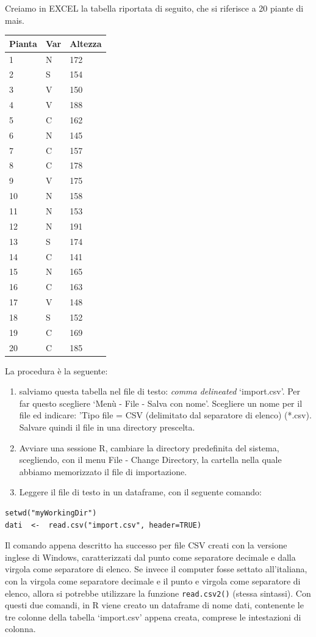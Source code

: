 \documentclass[a4paper,12pt,oneside]{book}
\providecommand{\tightlist}{%
  \setlength{\itemsep}{0pt}\setlength{\parskip}{0pt}}
\begin{document}
Creiamo in EXCEL la tabella riportata di seguito, che si riferisce a 20 piante di mais.

\begin{longtable}[]{@{}lll@{}}
\toprule
Pianta & Var & Altezza\tabularnewline
\midrule
\endhead
1 & N & 172\tabularnewline
2 & S & 154\tabularnewline
3 & V & 150\tabularnewline
4 & V & 188\tabularnewline
5 & C & 162\tabularnewline
6 & N & 145\tabularnewline
7 & C & 157\tabularnewline
8 & C & 178\tabularnewline
9 & V & 175\tabularnewline
10 & N & 158\tabularnewline
11 & N & 153\tabularnewline
12 & N & 191\tabularnewline
13 & S & 174\tabularnewline
14 & C & 141\tabularnewline
15 & N & 165\tabularnewline
16 & C & 163\tabularnewline
17 & V & 148\tabularnewline
18 & S & 152\tabularnewline
19 & C & 169\tabularnewline
20 & C & 185\tabularnewline
\bottomrule
\end{longtable}

La procedura è la seguente:

\begin{enumerate}
\def\labelenumi{\arabic{enumi}.}
\tightlist
\item
  salviamo questa tabella nel file di testo: \emph{comma delineated} `import.csv'. Per far questo scegliere `Menù - File - Salva con nome'. Scegliere un nome per il file ed indicare: 'Tipo file = CSV (delimitato dal separatore di elenco) (*.csv). Salvare quindi il file in una directory prescelta.
\item
  Avviare una sessione R, cambiare la directory predefinita del sistema, scegliendo, con il menu File - Change Directory, la cartella nella quale abbiamo memorizzato il file di importazione.
\item
  Leggere il file di testo in un dataframe, con il seguente comando:
\end{enumerate}

\begin{verbatim}
setwd("myWorkingDir")
dati  <-  read.csv("import.csv", header=TRUE)
\end{verbatim}

Il comando appena descritto ha successo per file CSV creati con la versione inglese di Windows, caratterizzati dal punto come separatore decimale e dalla virgola come separatore di elenco. Se invece il computer fosse settato all'italiana, con la virgola come separatore decimale e il punto e virgola come separatore di elenco, allora si potrebbe utilizzare la funzione \texttt{read.csv2()} (stessa sintassi). Con questi due comandi, in R viene creato un dataframe di nome dati, contenente le tre colonne della tabella `import.csv' appena creata, comprese le intestazioni di colonna.
\end{document}
